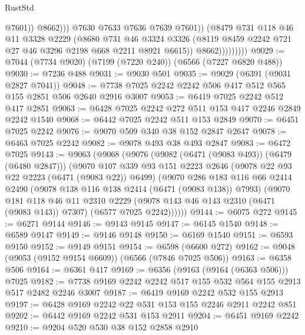 \begin{lexlean}{RustStd}
\begin{coremodule}
{\begin{coremodule}
{{{{{{{{{{{{{{{{{{{{{{{{{{                                  @7601))
                              @8662)))
                        @7630
                        @7633
                        @7636
                        @7639
                        @7601))
                    (@8479
                      @731
                      @118
                      @46
                      @11
                      @3328
                      @2229
                      (@8680
                        @731
                        @46
                        @3324
                        @3326
                        (@8119 @8459 @2242 @721 @27 @46 @3296 @2198 @668 @2211 @8921 @6615))
                      @8662)))))))))
@9029 := @7044 (@7734 @9020) (@7199 (@7220 @240)) (@6566 (@7227 @6820 @488))
@9030 := @7236 @488
@9031 := @9030 @501
@9035 := @9029 (@6391 (@9031 @2827 @7041))
@9048 := @7738 @7025 @2242 @2242 @506 @417 @512 @565 @155 @2851 @506 @2640 @2916 @3007
@9053 := @6419 @7025 @2242 @512 @417 @2851
@9063 := @6428 @7025 @2242 @272 @511 @153 @417 @2246 @2849 @2242 @1540
@9068 := @6442 @7025 @2242 @511 @153 @2849
@9070 := @6451 @7025 @2242
@9076 := @9070 @509 @340 @38 @152 @2847 @2647
@9078 := @6463 @7025 @2242
@9082 := @9078 @493 @38 @493 @2847
@9083 := @6472 @7025
@9143 := @9063
    (@9068
      (@9076
        (@9082 (@6471 (@9083 @493)) (@6479 (@6480 @2847)))
        (@9070
          @107
          @339
          @93
          @151
          @2223
          @2646
          (@9078 @22 @93 @22 @2223 (@6471 (@9083 @22)) @6499)
          (@9070
            @286
            @183
            @116
            @66
            @2414
            @2490
            (@9078 @138 @116 @138 @2414 (@6471 (@9083 @138)) @7993)
            (@9070
              @181
              @118
              @46
              @11
              @2310
              @2229
              (@9078 @143 @46 @143 @2310 (@6471 (@9083 @143)) @7307)
              (@6577 @7025 @2242))))))
@9144 := @6075 @272
@9145 := @6271 @9144
@9146 := @9143 @9145
@9147 := @6145 @1540
@9148 := @6589 @9147
@9149 := @9146 @9148
@9150 := @6169 @1540
@9151 := @6593 @9150
@9152 := @9149 @9151
@9154 := @6598 (@6600 @272)
@9162 := @9048 (@9053 (@9152 @9154 @6609)) (@6566 (@7846 @7025 @506))
@9163 := @6358 @506
@9164 := @6361 @417
@9169 := @6356 (@9163 (@9164 (@6363 @506))) @7025
@9182 := @7738 @9169 @2242 @2242 @517 @155 @532 @564 @155 @2913 @517 @2482 @2246 @3007
@9187 := @6419 @9169 @2242 @532 @155 @2913
@9197 := @6428 @9169 @2242 @22 @531 @153 @155 @2246 @2911 @2242 @851
@9202 := @6442 @9169 @2242 @531 @153 @2911
@9204 := @6451 @9169 @2242
@9210 := @9204 @520 @530 @38 @152 @2858 @2910
}}}}}}}}}}}}}}}}}}}}}}}}}}
\end{coremodule}}
\end{coremodule}
\end{lexlean}
